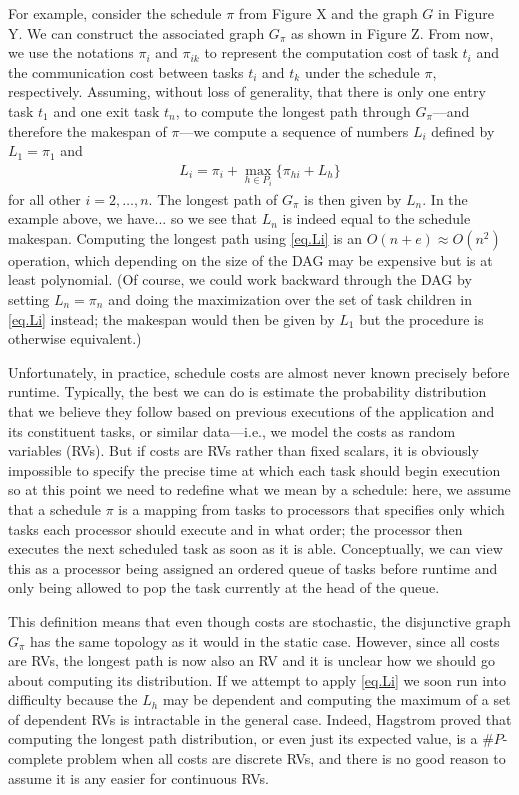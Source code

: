 \documentclass[12pt]{article}
\begin{document}
For example, consider the schedule $\pi$ from Figure X and the graph $G$ in Figure Y. We can construct the associated graph $G_\pi$ as shown in Figure Z. From now, we use the notations $\pi_i$ and $\pi_{ik}$ to represent the computation cost of task $t_i$ and the communication cost between tasks $t_i$ and $t_k$ under the schedule $\pi$, respectively. Assuming, without loss of generality, that there is only one entry task $t_1$ and one exit task $t_n$, to compute the longest path through $G_\pi$---and therefore the makespan of $\pi$---we compute a sequence of numbers $L_i$ defined by $L_1 = \pi_1$ and
\begin{align}
  \label{eq.Li}
  L_i = \pi_i + \max_{h \in P_i}\{ \pi_{hi} + L_h\}
\end{align}
for all other $i = 2, \dots, n$. The longest path of $G_\pi$ is then given by $L_n$. In the example above, we have... so we see that $L_n$ is indeed equal to the schedule makespan. Computing the longest path using \eqref{eq.Li} is an $O(n + e) \approx O(n^2)$ operation, which depending on the size of the DAG may be expensive but is at least polynomial. (Of course, we could work backward through the DAG by setting $L_n = \pi_n$ and doing the maximization over the set of task children in \eqref{eq.Li} instead; the makespan would then be given by $L_1$ but the procedure is otherwise equivalent.)

Unfortunately, in practice, schedule costs are almost never known precisely before runtime. Typically, the best we can do is estimate the probability distribution that we believe they follow based on previous executions of the application and its constituent tasks, or similar data---i.e., we model the costs as random variables (RVs). But if costs are RVs rather than fixed scalars, it is obviously impossible to specify the precise time at which each task should begin execution so at this point we need to redefine what we mean by a schedule: here, we assume that a schedule $\pi$ is a mapping from tasks to processors that specifies only which tasks each processor should execute and in what order; the processor then executes the next scheduled task as soon as it is able. Conceptually, we can view this as a processor being assigned an ordered queue of tasks before runtime and only being allowed to pop the task currently at the head of the queue. 

This definition means that even though costs are stochastic, the disjunctive graph $G_\pi$ has the same topology as it would in the static case. However, since all costs are RVs, the longest path is now also an RV and it is unclear how we should go about computing its distribution. If we attempt to apply \eqref{eq.Li} we soon run into difficulty because the $L_h$ may be dependent and computing the maximum of a set of dependent RVs is intractable in the general case. Indeed, Hagstrom \cite{hag88} proved that computing the longest path distribution, or even just its expected value, is a $\#P$-complete problem when all costs are discrete RVs, and there is no good reason to assume it is any easier for continuous RVs.      
\end{document}
